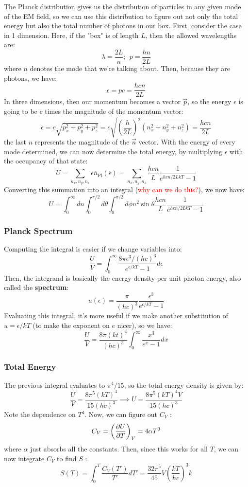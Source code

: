 \documentclass[10pt]{article}
\newcommand{\question}[1]{\textcolor{red}{#1}}
\begin{document}
	The Planck distribution gives us the distribution of particles in any given mode of the EM field, so we can use this 
	distribution to figure out not only the total energy but also the total number of photons in our box. First, consider 
	the case in 1 dimension. Here, if the "box" is of length \( L \), then the allowed wavelengths are:
	\[
	\lambda = \frac{2L}{n}; \ \ p = \frac{hn}{2L}
	\]
	where  \( n \) denotes the mode that we're talking about. Then, because they are photons, we have:
	\[
	\epsilon = pc = \frac{hcn}{2L}
	\] 
	In three dimensions, then our momentum becomes a vector \(  \vec p  \), so the energy \( \epsilon \) is going to be 
	\( c \) times the magnitude of the momentum vector:
	\[
	\epsilon = c \sqrt{p_x^2 + p_y ^2 + p_z^2} = c\sqrt{\left(\frac{h}{2L}\right)^2\left( n_x^2 + n_y^2 + n_z^2 \right) }  = 
	\frac{hcn}{2L}
	\] 
	the last \( n \) represents the magnitude of the \( \vec n \) vector. With the energy of every mode determined, we can now 
	determine the total energy, by multiplying \( \epsilon \) with the occupancy of that state:
	\[
	U = \sum_{n_x, n_y, n_z} \epsilon \overline n_{\text{Pl}}(\epsilon) = \sum_{n_x, n_y, n_z} 
	\frac{hcn}{L} \frac{1}{e^{hcn / 2LkT} - 1}
	\] 
	Converting this summation into an integral (\question{why can we do this?}), we now have:
	\[
		U = \int_0^{\infty} dn \int_0^{\pi /2} d\theta \int_0^{\pi /2} d\phi n^2 \sin \theta \frac{hcn}{L} 
		\frac{1}{e^{hcn / 2LkT} - 1}
	\] 
	\subsubsection{Planck Spectrum}
	Computing the integral is easier if we change variables into:
	\[
	\frac{U}{V} = \int_0^{\infty}\frac{8 \pi \epsilon^3 / (hc)^3}{e^{\epsilon / kT} - 1} d \epsilon
	\] 
	Then, the integrand is basically the energy density per unit photon energy, also called the \textbf{spectrum}:
	\[
	u(\epsilon) = \frac{\pi}{(hc)^3} \frac{\epsilon^3}{e^{\epsilon / kT} - 1}
	\]
	Evaluating this integral, it's more useful if we make another substitution of \( u = \epsilon / kT \) (to make the exponent on 
	\( e \) nicer), so we have:
	\[
	\frac{U}{V} = \frac{8\pi (kt)^{4}}{(hc)^3} \int_0^{\infty} \frac{x^3}{e^{x} - 1} dx
	\] 
	\subsubsection{Total Energy} 

	The previous integral evaluates to \( \pi^{4}/15\), so the total energy density is given by:
	\[
	\frac{U}{V} = \frac{8\pi^{5}(kT)^{4}}{15(hc)^3} \implies U = \frac{8\pi^{5}(kT)^{4}V}{15(hc)^3}
	\] 
	Note the dependence on \( T^{4} \). Now, we can figure out \( C_V \) :
	\[
		C_V = \left( \pdv{U}{T} \right)_V = 4\alpha T^3
	\] 
	where \( \alpha \) just absorbs all the constants. Then, since this works for all \( T \), we can now integrate 
	\( C_V \) to find \( S \) :
	\[
	S(T) = \int_0^{T} \frac{C_V(T')}{T'}dT' = \frac{32 \pi^{5}}{45}V \left( \frac{kT}{hc} \right) ^3 k 
	\] 
\end{document}
